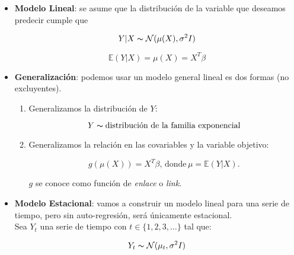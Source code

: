 \documentclass{beamer}
\begin{document}
\begin{frame}{}

 \begin{itemize}
   \item
   {\bf{Modelo Lineal}}: se asume que la distribución de la variable que deseamos predecir cumple que 
 \begin{exampleblock}{}
\[
Y|X \thicksim \mathcal{N}(\mu(X) , \sigma^2 I)
\]
\end{exampleblock}

\begin{exampleblock}{}
\[
\mathbb{E}(Y|X) = \mu(X) = X^T \beta  
\]
\end{exampleblock}

  \end{itemize}
\end{frame}


\begin{frame}{}
 \begin{itemize}
   \item
   {\bf{Generalización}}: podemos usar un modelo general lineal es dos formas (no excluyentes). 
\begin{enumerate}
\item Generalizamos la distribución de $Y$:
 \begin{exampleblock}{}
\[
Y \thicksim \text{distribución de la familia exponencial}
\]
\end{exampleblock}

\item Generalizamos la relación en las covariables y la variable objetivo:
\begin{exampleblock}{}
\[
g(\mu(X)) = X^T \beta,  \, \text{donde} \, \mu = \mathbb{E}(Y|X).   
\]
\end{exampleblock}
 $g$ se conoce como función de {\it{enlace}} o {\it{link}}.
\end{enumerate}
  \end{itemize}
\end{frame}

\begin{frame}{}
 \begin{itemize}
   \item
   {\bf{Modelo Estacional}}: vamos a construir un modelo lineal para una serie de tiempo, pero sin auto-regresión, será únicamente estacional. \\

Sea $Y_t$ una serie de tiempo con $t \in \{  1,2,3, \dots \}$ tal que: 
 \begin{exampleblock}{}
\[
Y_t \thicksim \mathcal{N}( \mu_t , \sigma^2 I)
\]
\end{exampleblock}

  \end{itemize}
\end{frame}
\end{document}
